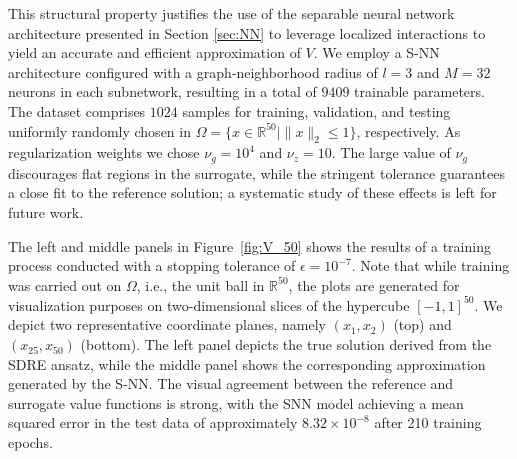 \documentclass{article}
\newcommand{\R}{\mathbb{R}}
\begin{document}
This structural property justifies the use of the separable neural network architecture presented in Section \ref{sec:NN} to leverage localized interactions to yield an accurate and efficient approximation of \(V\). We employ a S-NN architecture configured with a graph‑neighborhood radius of \(l = 3\) and \(M = 32\) neurons in each subnetwork, resulting in a total of \(9409\) trainable parameters. The dataset comprises \(1024\) samples for training, validation, and testing uniformly randomly chosen in $\Omega = \{ x \in \R^{50} \mid \| x \|_2 \le 1 \}$, respectively.  As regularization weights we chose \(\nu_{g} = 10^{4}\) and \(\nu_{z} = 10\). The large value of \(\nu_{g}\) discourages flat regions in the surrogate, while the stringent tolerance guarantees a close fit to the reference solution; a systematic study of these effects is left for future work. 

The left and middle panels in Figure~\ref{fig:V_50} shows the results of a training process conducted with a stopping tolerance of \(\epsilon = 10^{-7}\). Note that while training was carried out on $\Omega$, i.e., the unit ball in $\R^{50}$, the plots are generated for visualization purposes on two-dimensional slices of the hypercube $[-1,1]^{50}$. We depict two representative coordinate planes, namely \((x_1, x_2)\) (top) and \((x_{25}, x_{50})\) (bottom). The left panel depicts the true solution derived from the SDRE ansatz, while the middle panel shows the corresponding approximation generated by the S-NN. The visual agreement between the reference and surrogate value functions is strong, with the SNN model achieving a mean squared error in the test data of approximately \(8.32 \times 10^{-8}\) after 210 training epochs. 
\end{document}
